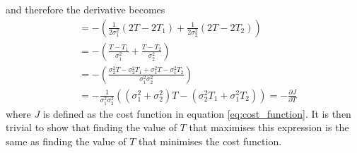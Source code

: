 and therefore the derivative becomes
\begin{align*}
    &=
    - \left(
    \frac{1}{2\sigma_1^2} \left( 2T - 2T_1 \right) +  \frac{1}{2\sigma_2^2} \left( 2T - 2T_2 \right)
    \right) \\
    &=
    - \left(
    \frac{T-T_1}{\sigma_1^2} + \frac{T-T_2}{\sigma_2^2}
    \right) \\
    &=
    - \left(
    \frac{\sigma_2^2 T - \sigma_2^2 T_1 + \sigma_1^2 T - \sigma_1^2 T_2}{\sigma_1^2 \sigma_2^2}
    \right) \\
    &=
    - \frac{1}{\sigma_1^2 \sigma_2^2}
    \left(
    \left(\sigma_1^2 + \sigma_2^2 \right) T
    -
    \left( \sigma_2^2 T_1 + \sigma_1^2 T_2 \right)
    \right)
    =
    - \frac{\partial J}{\partial T}
\end{align*}
where $J$ is defined as the cost function in equation \ref{eq:cost_function}.
It is then trivial to show that finding the value of $T$ that maximises this expression is the same as finding the value of $T$ that minimises the cost function.


